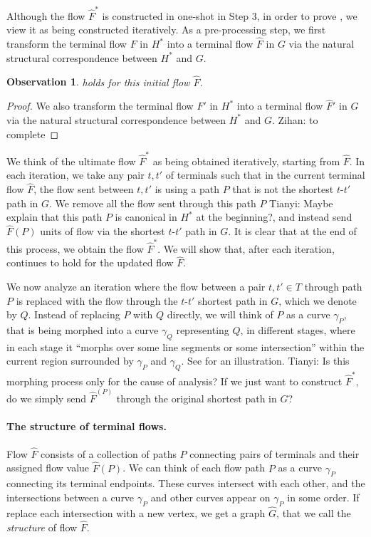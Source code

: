 \documentclass[11pt]{article}
\newcommand{\zihan}[1]{{\color{blue} Zihan: #1}}
\newcommand{\tianyi}[1]{{\color{purple} Tianyi: #1}}
\newtheorem{observation}[theorem]{Observation}
\begin{document}
\fi

\iffalse
Although the flow $\hat F^*$ is constructed in one-shot in Step 3, in order to prove , we view it as being constructed iteratively.
As a pre-processing step, we first transform the terminal flow $F$ in $H^*$ into a terminal flow $\hat F$ in $G$ via the natural structural correspondence between $H^*$ and $G$.

\begin{observation}
\label{obs: initial}
 holds for this initial flow $\hat F$.
\end{observation}
\begin{proof}
We also transform the terminal flow $F'$ in $H^*$ into a terminal flow $\hat F'$ in $G$ via the natural structural correspondence between $H^*$ and $G$.
\zihan{to complete}
\end{proof}

We think of the ultimate flow $\hat F^*$ as being obtained iteratively, starting from $\hat F$.
In each iteration, we take any pair $t,t'$ of terminals such that in the current terminal flow $\hat F$, the flow sent between $t,t'$ is using a path $P$ that is not the shortest $t$-$t'$ path in $G$. We remove all the flow sent through this path $P$ \tianyi{Maybe explain that this path $P$ is canonical in $H^*$ at the beginning?}, and instead send $\hat F(P)$ units of flow via the shortest $t$-$t'$ path in $G$.
It is clear that at the end of this process, we obtain the flow $\hat F^*$.
We will show that, after each iteration,
 continues to hold for the updated flow $\hat F$.

We now analyze an iteration where the flow between a pair $t,t'\in T$ through path $P$ is replaced with the flow through the $t$-$t'$ shortest path in $G$, which we denote by $Q$.
Instead of replacing $P$ with $Q$ directly,
we will think of $P$ as a curve $\gamma_P$, that is being morphed into a curve $\gamma_Q$ representing $Q$, in different stages, where in each stage it ``morphs over some line segments or some intersection'' within the current region surrounded by $\gamma_P$ and $\gamma_Q$. See  for an illustration. \tianyi{Is this morphing process only for the cause of analysis? If we just want to construct $\hat{F}^*$, do we simply send $\hat{F}^(P)$ through the original shortest path in $G$?}


\paragraph{The structure of terminal flows.}
Flow $\hat F$ consists of a collection of paths $P$ connecting pairs of terminals and their assigned flow value $\hat F(P)$. We can think of each flow path $P$ as a curve $\gamma_P$ connecting its terminal endpoints. These curves intersect with each other, and the intersections between a curve $\gamma_P$ and other curves appear on $\gamma_P$ in some order. If replace each intersection with a new vertex, we get a graph $\hat G$, that we call the \emph{structure} of flow $\hat F$.
\end{document}
